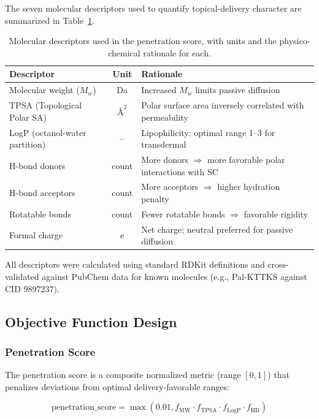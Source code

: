 \documentclass[11pt,letterpaper]{article}
\begin{document}
The seven molecular descriptors used to quantify topical-delivery character are summarized in Table~\ref{tab:descriptors}.

\begin{table}[H]
\centering
\small
\caption{Molecular descriptors used in the penetration score, with units and the physico-chemical rationale for each.}
\label{tab:descriptors}
\begin{tabular}{lcl}
\toprule
\textbf{Descriptor} & \textbf{Unit} & \textbf{Rationale} \\
\midrule
Molecular weight ($M_w$) & Da & Increased $M_w$ limits passive diffusion \\
TPSA (Topological Polar SA) & $\text{\AA}^2$ & Polar surface area inversely correlated with permeability \\
LogP (octanol-water partition) & -- & Lipophilicity; optimal range 1--3 for transdermal \\
H-bond donors & count & More donors $\Rightarrow$ more favorable polar interactions with SC \\
H-bond acceptors & count & More acceptors $\Rightarrow$ higher hydration penalty \\
Rotatable bonds & count & Fewer rotatable bonds $\Rightarrow$ favorable rigidity \\
Formal charge & e & Net charge; neutral preferred for passive diffusion \\
\bottomrule
\end{tabular}
\end{table}

All descriptors were calculated using standard RDKit definitions and cross-validated against PubChem data for known molecules (e.g., Pal-KTTKS against CID 9897237).

\subsection{Objective Function Design}

\subsubsection{Penetration Score}

The penetration score is a composite normalized metric (range $[0, 1]$) that penalizes deviations from optimal delivery-favorable ranges:

\begin{equation}
\text{penetration\_score} = \max(0.01, f_{\text{MW}} \cdot f_{\text{TPSA}} \cdot f_{\text{LogP}} \cdot f_{\text{HB}})
\label{eq:penetration_score}
\end{equation}
\end{document}

